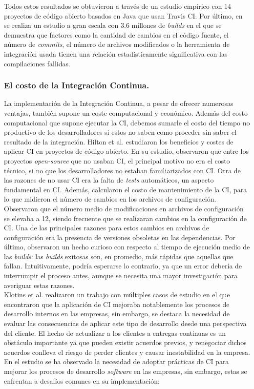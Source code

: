 Todos estos resultados se obtuvieron a través de un estudio empírico con 14 proyectos de código
abierto basados en Java que usan Travis CI. Por último, en \cite{16} se realiza un estudio a gran
escala con 3.6 millones de \textit{builds} en el que se demuestra que factores como la cantidad
de cambios en el código fuente, el número de \textit{commits}, el número de archivos modificados
o la herramienta de integración usada tienen una relación estadísticamente significativa con las
compilaciones fallidas.\\ 

\subsubsection{El costo de la Integración Continua.}
La implementación de la Integración Continua, a pesar de ofrecer numerosas ventajas, también
supone un coste computacional y económico. Además del costo computacional que supone ejecutar
la CI, debemos sumarle el costo del tiempo no productivo de los desarrolladores si estos
no saben como proceder sin saber el resultado de la integración. Hilton et al. \cite{10} estudiaron
los beneficios y costes de aplicar CI en proyectos de código abierto. En su estudio,
observaron que entre los proyectos \textit{open-source} que no usaban CI, el principal
motivo no era el costo técnico, si no que los desarrolladores no estaban familiarizados con
CI. Otra de las razones de no usar CI era la falta de \textit{tests} automáticos,
un aspecto fundamental en CI. Además, calcularon el costo de mantenimiento de la
CI, para lo que midieron el número de cambios en los archivos de configuración. Observaron
que el número medio de modificaciones en archivos de configuración se elevaba a 12, siendo
frecuente que se realizaran cambios en la configuración de CI. Una de las principales
razones para estos cambios en archivos de configuración era la presencia de versiones obsoletas
en las dependencias. Por último, observaron un hecho curioso con respecto al tiempo de ejecución
medio de las \textit{builds}: las \textit{builds} exitosas son, en promedio, más rápidas que
aquellas que fallan. Intuitivamente, podría esperarse lo contrario, ya que un error debería de
interrumpir el proceso antes, aunque se necesita una mayor investigación para averiguar estas
razones.\\

Klotins et al. \cite{18} realizaron un trabajo con múltiples casos de estudio en el que
encontraron que la aplicación de CI mejoraba notablemente los procesos de desarrollo
internos en las empresas, sin embargo, se destaca la necesidad de evaluar las consecuencias de
aplicar este tipo de desarrollo desde una perspectiva del cliente. El hecho de actualizar a los
clientes a entregas continuas es un obstáculo importante ya que pueden existir acuerdos previos,
y renegociar dichos acuerdos conlleva el riesgo de perder clientes y causar inestabilidad en la
empresa. En el estudio se ha observado la necesidad de adoptar prácticas de CI para
mejorar los procesos de desarrollo \textit{software} en las empresas, sin embargo, estas se
enfrentan a desafíos comunes en su implementación:

